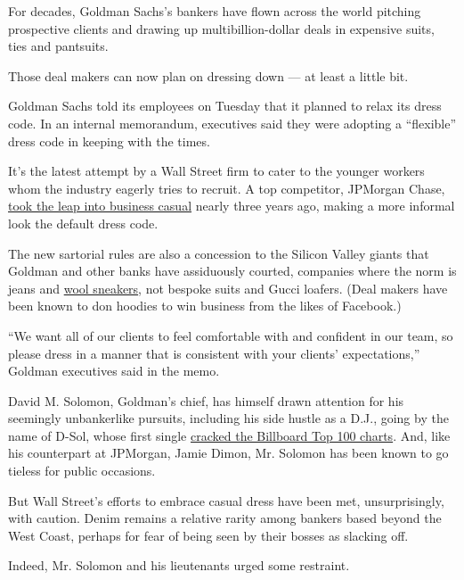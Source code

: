 For decades, Goldman Sachs's bankers have flown across the world
pitching prospective clients and drawing up multibillion-dollar deals in
expensive suits, ties and pantsuits.

Those deal makers can now plan on dressing down --- at least a little
bit.

Goldman Sachs told its employees on Tuesday that it planned to relax its
dress code. In an internal memorandum, executives said they were
adopting a ``flexible'' dress code in keeping with the times.

It's the latest attempt by a Wall Street firm to cater to the younger
workers whom the industry eagerly tries to recruit. A top competitor,
JPMorgan Chase,
\href{https://www.nytimes3xbfgragh.onion/2016/06/04/business/dealbook/jpmorgan-chase-embraces-business-casual.html?dlbk}{took
the leap into business casual} nearly three years ago, making a more
informal look the default dress code.

The new sartorial rules are also a concession to the Silicon Valley
giants that Goldman and other banks have assiduously courted, companies
where the norm is jeans and
\href{https://www.nytimes3xbfgragh.onion/2017/08/11/technology/allbird-shoes-silicon-valley.html?dlbk}{wool
sneakers}, not bespoke suits and Gucci loafers. (Deal makers have been
known to don hoodies to win business from the likes of Facebook.)

``We want all of our clients to feel comfortable with and confident in
our team, so please dress in a manner that is consistent with your
clients' expectations,'' Goldman executives said in the memo.

David M. Solomon, Goldman's chief, has himself drawn attention for his
seemingly unbankerlike pursuits, including his side hustle as a D.J.,
going by the name of D-Sol, whose first single
\href{https://markets.businessinsider.com/news/stocks/goldman-sachs-ceo-david-solomon-dj-d-sol-billboard-charts-fleetwood-mac-2018-7-1027408060?dlbk}{cracked
the Billboard Top 100 charts}. And, like his counterpart at JPMorgan,
Jamie Dimon, Mr. Solomon has been known to go tieless for public
occasions.

But Wall Street's efforts to embrace casual dress have been met,
unsurprisingly, with caution. Denim remains a relative rarity among
bankers based beyond the West Coast, perhaps for fear of being seen by
their bosses as slacking off.

Indeed, Mr. Solomon and his lieutenants urged some restraint.

